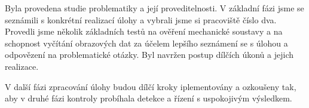 \documentclass[a4paper,10pt]{article}
\begin{document}
Byla provedena studie problematiky a její proveditelnosti. V základní fázi jsme se seznámili s konkrétní realizací úlohy a vybrali jsme si pracoviště číslo dva. Provedli jsme několik základních testů na ověření mechanické soustavy a na schopnost vyčítání obrazových dat za účelem lepšího seznámení se s úlohou a odpovězení na problematické otázky. Byl navržen postup dílčích úkonů a jejich realizace.

V další fázi zpracování úlohy budou dílčí kroky iplementovány a ozkoušeny tak, aby v druhé fázi kontroly probíhala detekce a řízení s  uspokojivým výsledkem.



\end{document}
